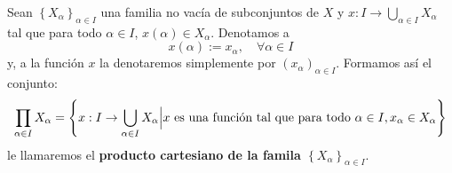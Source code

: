 \documentclass[12pt]{report}
\theoremstyle{largebreak}
\newcommand\cf[3]{\ensuremath{#1:#2\rightarrow#3}}
\begin{document}
    \begin{mydef}
        Sean $\left\{X_\alpha \right\}_{\alpha\in I}$ una familia no vacía de subconjuntos de $X$ y $\cf{x}{I}{\bigcup_{\alpha\in I}X_\alpha}$ tal que para todo $\alpha\in I$, $x(\alpha)\in X_\alpha$. Denotamos a
        \begin{equation*}
            x(\alpha):=x_\alpha,\quad\forall \alpha\in I
        \end{equation*}
        y, a la función $x$ la denotaremos simplemente por $\left(x_\alpha \right)_{\alpha\in I}$. Formamos así el conjunto:
        \begin{equation*}
            \prod_{\alpha\in I}X_\alpha=\left\{\cf{x}{I}{\bigcup_{\alpha\in I}X_\alpha}\Big|x\textup{ es una función tal que para todo }\alpha\in I,x_\alpha\in X_\alpha \right\}
        \end{equation*}
        le llamaremos el \textbf{producto cartesiano de la famila $\left\{X_\alpha \right\}_{\alpha\in I}$}.
    \end{mydef}
\end{document}
